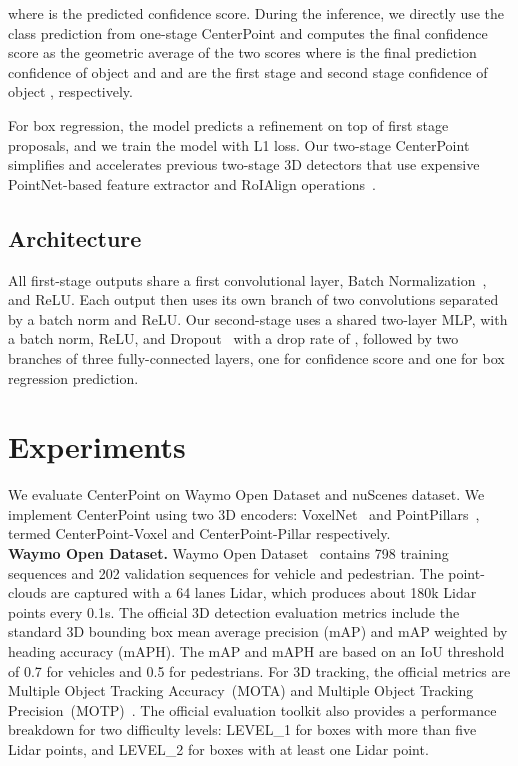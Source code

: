 \documentclass[final]{cvpr}
\begin{document}
\noindent 
where  is the predicted confidence score. 
During the inference, we directly use the class prediction from one-stage CenterPoint and computes the final confidence score as the geometric average of the two scores 
where  is the final prediction confidence of object  and  and  are the first stage and second stage confidence of object , respectively. 

For box regression, the model predicts a refinement on top of first stage proposals, and we train the model with L1 loss.
Our two-stage CenterPoint simplifies and accelerates previous two-stage 3D detectors that use expensive PointNet-based feature extractor and RoIAlign operations~\cite{shi2019pointrcnn, pvrcnn}.

\subsection{Architecture}
All first-stage outputs share a first  convolutional layer, Batch Normalization~\cite{ioffe2015batch}, and ReLU.
Each output then uses its own branch of two  convolutions separated by a batch norm and ReLU.
Our second-stage uses a shared two-layer MLP, with a batch norm, ReLU, and Dropout~\cite{hinton2012improving} with a drop rate of , followed by two branches of three fully-connected layers, one for confidence score and one for box regression prediction. 

\section{Experiments}

We evaluate CenterPoint on Waymo Open Dataset and nuScenes dataset.
We implement CenterPoint using two 3D encoders: VoxelNet~\cite{voxelnet,yan2018second,zhu2019classbalanced} and PointPillars~\cite{pillar}, termed CenterPoint-Voxel and CenterPoint-Pillar respectively.\\

\noindent 
\textbf{Waymo Open Dataset.}
Waymo Open Dataset~\cite{sun2019scalability} contains 798 training sequences and 202 validation sequences for vehicle and pedestrian. 
The point-clouds are captured with a 64 lanes Lidar, which produces about 180k Lidar points every 0.1s. 
The official 3D detection evaluation metrics include the standard 3D bounding box mean average precision (mAP) and mAP weighted by heading accuracy (mAPH).
The mAP and mAPH are based on an IoU threshold of 0.7 for vehicles and 0.5 for pedestrians. 
For 3D tracking, 
the official metrics are
Multiple Object Tracking Accuracy~(MOTA) and Multiple Object Tracking Precision~(MOTP)~\cite{bernardin2006multiple}.
The official evaluation toolkit also provides a performance breakdown for two difficulty levels: 
LEVEL\_1 for boxes with more than five Lidar points, and LEVEL\_2 for boxes with at least one Lidar point. 
\end{document}
